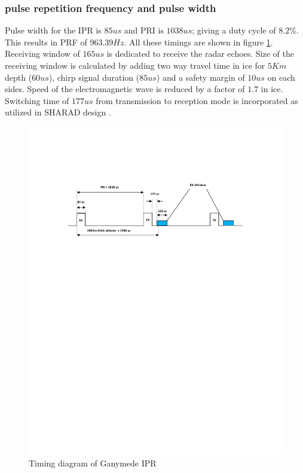 \subsubsection{pulse repetition frequency and pulse width}
Pulse width for the \ac{IPR} is $85 us $ and \ac{PRI} is $1038 us$; giving a duty cycle of $8.2\% $. This results in \ac{PRF} of $963.39 Hz$. All these timings are shown in figure \ref{fig:PRI}. Receiving window of $165 us$ is dedicated to receive the radar echoes. Size of the receiving window is calculated by adding two way travel time in ice for $5 Km $ depth ($60 us$), chirp signal duration ($85 us$) and  a safety margin of $10 us$ on each sides. Speed of the electromagnetic wave is reduced by a factor of $1.7$ in ice. Switching time of $177 us$ from transmission to reception mode is incorporated as utilized in \ac{SHARAD} design \cite{SHARAD}.
%
\begin{figure}[bht]
\centering
\includegraphics[scale=0.7]{Figures/PRI.pdf}
\caption{Timing diagram of Ganymede \ac{IPR}} 
\label{fig:PRI}
\end{figure}
%

